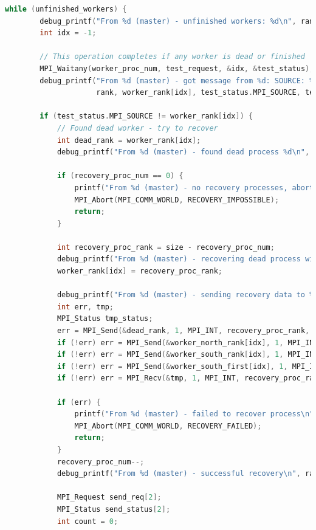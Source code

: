 \documentclass[a4paper]{article}
\begin{document}
\begin{lstlisting}[caption=jac\_3d\_mpi\_ft.c, label={lst:2}, language=C]
    while (unfinished_workers) {
        debug_printf("From %d (master) - unfinished workers: %d\n", rank, unfinished_workers);
        int idx = -1;

        // This operation completes if any worker is dead or finished
        MPI_Waitany(worker_proc_num, test_request, &idx, &test_status);
        debug_printf("From %d (master) - got message from %d: SOURCE: %d, TAG: %d, ERROR: %d\n",
                     rank, worker_rank[idx], test_status.MPI_SOURCE, test_status.MPI_TAG, test_status.MPI_ERROR);

        if (test_status.MPI_SOURCE != worker_rank[idx]) {
            // Found dead worker - try to recover
            int dead_rank = worker_rank[idx];
            debug_printf("From %d (master) - found dead process %d\n", rank, dead_rank);

            if (recovery_proc_num == 0) {
                printf("From %d (master) - no recovery processes, abort", rank);
                MPI_Abort(MPI_COMM_WORLD, RECOVERY_IMPOSSIBLE);
                return;
            }

            int recovery_proc_rank = size - recovery_proc_num;
            debug_printf("From %d (master) - recovering dead process with %d\n", rank, recovery_proc_rank);
            worker_rank[idx] = recovery_proc_rank;

            debug_printf("From %d (master) - sending recovery data to %d\n", rank, recovery_proc_rank);
            int err, tmp;
            MPI_Status tmp_status;
            err = MPI_Send(&dead_rank, 1, MPI_INT, recovery_proc_rank, RECOVERY_REQ_TAG, MPI_COMM_WORLD);
            if (!err) err = MPI_Send(&worker_north_rank[idx], 1, MPI_INT, recovery_proc_rank, RECOVERY_REQ_TAG, MPI_COMM_WORLD);
            if (!err) err = MPI_Send(&worker_south_rank[idx], 1, MPI_INT, recovery_proc_rank, RECOVERY_REQ_TAG, MPI_COMM_WORLD);
            if (!err) err = MPI_Send(&worker_south_first[idx], 1, MPI_INT, recovery_proc_rank, RECOVERY_REQ_TAG, MPI_COMM_WORLD);
            if (!err) err = MPI_Recv(&tmp, 1, MPI_INT, recovery_proc_rank, RECOVERY_REQ_TAG, MPI_COMM_WORLD, &tmp_status);

            if (err) {
                printf("From %d (master) - failed to recover process\n", rank);
                MPI_Abort(MPI_COMM_WORLD, RECOVERY_FAILED);
                return;
            }
            recovery_proc_num--;
            debug_printf("From %d (master) - successful recovery\n", rank);

            MPI_Request send_req[2];
            MPI_Status send_status[2];
            int count = 0;


\end{lstlisting}
\end{document}
